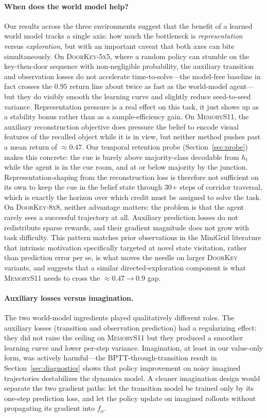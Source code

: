 \documentclass[letterpaper]{article}
\begin{document}
\paragraph{When does the world model help?}
Our results across the three environments suggest that the benefit of a
learned world model tracks a single axis: how much the bottleneck is
\emph{representation} versus \emph{exploration}, but with an important
caveat that both axes can bite simultaneously. On \textsc{DoorKey-5x5},
where a random policy can stumble on the key-then-door sequence with
non-negligible probability, the auxiliary transition and observation
losses do not accelerate time-to-solve---the model-free baseline in fact
crosses the $0.95$ return line about twice as fast as the world-model
agent---but they do visibly smooth the learning curve and slightly
reduce seed-to-seed variance. Representation pressure is a real effect
on this task, it just shows up as a stability bonus rather than as a
sample-efficiency gain. On \textsc{MemoryS11}, the auxiliary reconstruction
objective does pressure the belief to encode visual features of the
recalled object while it is in view, but neither method pushes past a
mean return of $\approx 0.47$. Our temporal retention probe
(Section~\ref{sec:probe}) makes this concrete: the cue is barely above
majority-class decodable from $h_t$ while the agent is in the cue room,
and at or below majority by the junction. Representation-shaping from
the reconstruction loss is therefore not sufficient on its own to keep
the cue in the belief state through 30+ steps of corridor traversal,
which is exactly the horizon over which credit must be assigned to solve
the task. On
\textsc{DoorKey-8x8}, neither advantage matters: the problem is that the
agent rarely sees a successful trajectory at all. Auxiliary prediction
losses do not redistribute sparse rewards, and their gradient magnitude
does not grow with task difficulty. This pattern matches prior
observations in the MiniGrid literature that intrinsic motivation
specifically targeted at novel state visitation, rather than prediction
error per se, is what moves the needle on larger \textsc{DoorKey}
variants, and suggests that a similar directed-exploration component is
what \textsc{MemoryS11} needs to cross the $\approx 0.47 \to 0.9$ gap.

\paragraph{Auxiliary losses versus imagination.}
The two world-model ingredients played qualitatively different roles. The
auxiliary losses (transition and observation prediction) had a
regularizing effect: they did not raise the ceiling on \textsc{MemoryS11}
but they produced a smoother learning curve and lower per-step variance.
Imagination, at least in our value-only form, was actively harmful---the
BPTT-through-transition result in Section~\ref{sec:diagnostics} shows that
policy improvement on noisy imagined trajectories destabilizes the
dynamics model. A cleaner imagination design would separate the two
gradient paths: let the transition model be trained only by its one-step
prediction loss, and let the policy update on imagined rollouts without
propagating its gradient into $f_\phi$.
\end{document}
